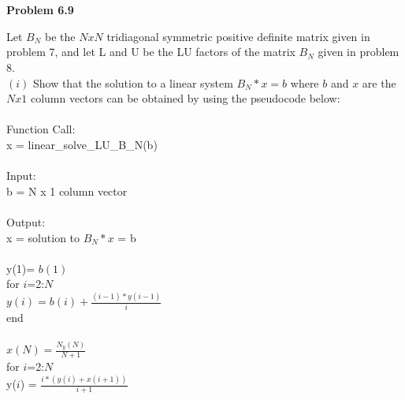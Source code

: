 \documentclass{article}
\begin{document}
\section{}
\textbf {Problem 6.9} \\
\par Let \(B_N\) be the \(NxN\) tridiagonal symmetric positive definite matrix given in problem 7, and let L and U be the LU factors of the matrix  \(B_N\) given in problem 8.\\
\((i)\) Show that the solution to a linear system \(B_N*x=b\) where \(b\) and \(x\) are the \(Nx1\) column vectors can be obtained by using the pseudocode below:\\\\
			\indent \hspace{5 cm}	Function Call:\\
			\indent \hspace{5 cm}	x = linear\_solve\_LU\_B\_N(b)\\\\
			\indent \hspace{5 cm}	Input:\\
			\indent \hspace{5 cm}	b = N x 1 column vector \\\\
			\indent \hspace{5 cm}	Output:\\
			\indent \hspace{5 cm}	x = solution to \(B_N*x\) = b\\\\
			\indent \hspace{5 cm}	y(1)= \(b(1)\) \\
			\indent \hspace{5 cm}	for \(i\)=2:\(N\) \\
			\indent \hspace{5 cm}	\indent \(y(i) = b(i) + \frac{(i-1)*y(i-1)}{i}\)\\ 
			\indent \hspace{5 cm}	end \\\\
			\indent \hspace{5 cm}	\(x(N) = \frac{N_y(N)}{N+1}\)\\
			\indent \hspace{5 cm}	for \(i\)=2:\(N\) \\
			\indent \hspace{5 cm} \indent y(\(i\)) = \(\frac{i*(y(i)+x(i+1))}{i+1}\) \\
\end{document}

